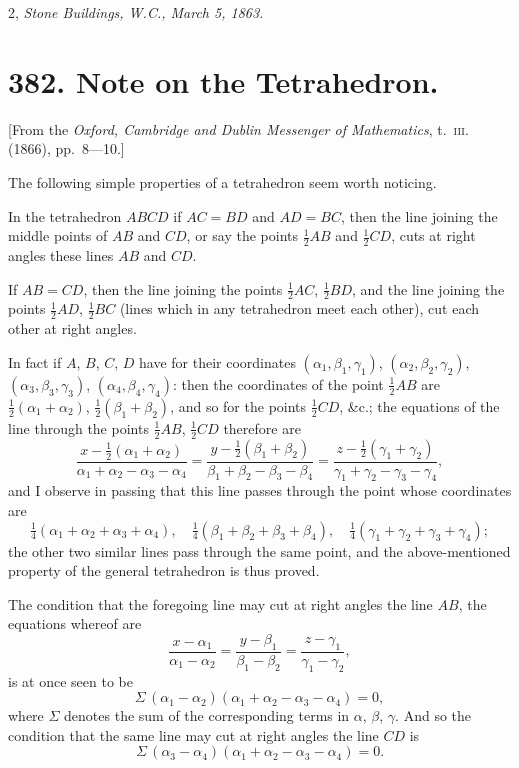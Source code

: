 \documentclass[11pt,a4paper]{article}
\begin{document}
\begin{flushright}
2, \textit{Stone Buildings, W.C., March 5, 1863.}
\end{flushright}

\newpage


\section*{382. Note on the Tetrahedron.}

[From the \textit{Oxford, Cambridge and Dublin Messenger of Mathematics}, t.\ \textsc{iii}. (1866), pp.\ 8---10.]

The following simple properties of a tetrahedron seem worth noticing.

In the tetrahedron $ABCD$ if $AC=BD$ and $AD=BC$, then the line joining the
middle points of $AB$ and $CD$, or say the points $\frac12AB$ and $\frac12CD$, cuts at right angles
these lines $AB$ and $CD$.

If $AB=CD$, then the line joining the points $\frac12AC$, $\frac12BD$, and the line joining
the points $\frac12AD$, $\frac12BC$ (lines which in any tetrahedron meet each other), cut each
other at right angles.

In fact if $A$, $B$, $C$, $D$ have for their coordinates $(\alpha_1, \beta_1, \gamma_1)$, $(\alpha_2, \beta_2, \gamma_2)$, $(\alpha_3, \beta_3, \gamma_3)$,
$(\alpha_4, \beta_4, \gamma_4)$: then the coordinates of the point $\frac12AB$ are $\frac12(\alpha_1+\alpha_2)$, $\frac12(\beta_1+\beta_2)$, and so
for the points $\frac12CD$, \&c.; the equations of the line through the points $\frac12AB$, $\frac12CD$
therefore are
\[
\frac{x - \frac12(\alpha_1+\alpha_2)}{\alpha_1+\alpha_2-\alpha_3-\alpha_4}
= \frac{y - \frac12(\beta_1+\beta_2)}{\beta_1+\beta_2-\beta_3-\beta_4}
= \frac{z - \frac12(\gamma_1+\gamma_2)}{\gamma_1+\gamma_2-\gamma_3-\gamma_4},
\]
and I observe in passing that this line passes through the point whose coordinates are
\[
\tfrac14(\alpha_1+\alpha_2+\alpha_3+\alpha_4),\quad
\tfrac14(\beta_1+\beta_2+\beta_3+\beta_4),\quad
\tfrac14(\gamma_1+\gamma_2+\gamma_3+\gamma_4);
\]
the other two similar lines pass through the same point, and the above-mentioned
property of the general tetrahedron is thus proved.

The condition that the foregoing line may cut at right angles the line $AB$, the
equations whereof are
\[
\frac{x-\alpha_1}{\alpha_1-\alpha_2} = \frac{y-\beta_1}{\beta_1-\beta_2} = \frac{z-\gamma_1}{\gamma_1-\gamma_2},
\]
is at once seen to be
\[
\Sigma\,(\alpha_1-\alpha_2)(\alpha_1+\alpha_2-\alpha_3-\alpha_4) = 0,
\]
where $\Sigma$ denotes the sum of the corresponding terms in $\alpha$, $\beta$, $\gamma$. And so the
condition that the same line may cut at right angles the line $CD$ is
\[
\Sigma\,(\alpha_3-\alpha_4)(\alpha_1+\alpha_2-\alpha_3-\alpha_4) = 0.
\]
\end{document}
